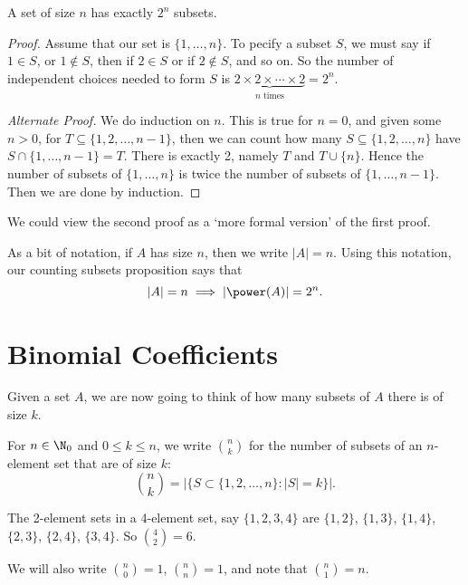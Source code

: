 \documentclass[a4paper]{scrreprt}
\begin{document}
\begin{proposition}
	A set of size $n$ has exactly $2^n$ subsets.
\end{proposition}
\begin{proof}
	Assume that our set is $\{1, \dots, n\}$. To pecify a subset $S$, we must say if $1 \in S$, or $1 \not\in S$, then if $2 \in S$ or if $2 \not\in S$, and so on. So the number of independent choices needed to form $S$ is $\underbrace{2 \times 2 \times \cdots \times 2}_{\text{$n$ times}} = 2^n$.

	\emph{Alternate Proof.}
	We do induction on $n$. This is true for $n = 0$, and given some $n > 0$, for $T \subseteq \{1, 2, \dots, n - 1\}$, then we can count how many $S \subseteq \{1, 2, \dots, n\}$ have $S \cap \{1, \dots, n - 1\} = T$. There is exactly 2, namely $T$ and $T \cup \{n\}$. Hence the number of subsets of $\{1, \dots, n\}$ is twice the number of subsets of $\{1, \dots, n - 1\}$. Then we are done by induction.
\end{proof}
\begin{remark}
	We could view the second proof as a `more formal version' of the first proof.
\end{remark}

As a bit of notation, if $A$ has size $n$, then we write $|A| = n$. Using this notation, our counting subsets proposition says that
$$
|A| = n \implies |\power(A)| = 2^n.
$$

\section{Binomial Coefficients}

Given a set $A$, we are now going to think of how many subsets of $A$ there is of size $k$.

\begin{definition}
	For $n \in \N_0$ and $0 \leq k \leq n$, we write $\binom{n}{k}$ for the number of subsets of an $n$-element set that are of size $k$:
	$$
	\binom{n}{k} = \left|\{S \subset \{1, 2, \dots, n\} : |S| = k\}\right|.
	$$
\end{definition}

\begin{example}
	The 2-element sets in a 4-element set, say $\{1, 2, 3, 4\}$ are $\{1, 2\}$, $\{1, 3\}$, $\{1, 4\}$, $\{2, 3\}$, $\{2, 4\}$, $\{3, 4\}$. So $\binom{4}{2} = 6$.
\end{example}

We will also write $\binom{n}{0} = 1$, $\binom{n}{n} = 1$, and note that $\binom{n}{1} = n$.
\end{document}
